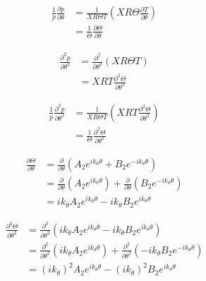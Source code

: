 \documentclass[a4paper]{article}
\begin{document}
\begin{align*}
    \frac{1}{p}\frac{\partial p}{\partial \theta} 
    &=
    \frac{ 1}{X R \Theta T}  \left( XR\Theta\frac{\partial T}{\partial \theta} \right) \\
    &=\frac{ 1}{ \Theta}\frac{\partial \Theta}{\partial \theta}  
\end{align*}

\begin{align*}
    \frac{\partial^2 p}{\partial \theta^2} 
    &=
    \frac{\partial^2 }{\partial \theta^2}  \left( XR\Theta T \right) \\
    &=
    XRT\frac{\partial^2 \Theta }{\partial \theta^2}  
\end{align*}


\begin{align*}
    \frac{1}{p}\frac{\partial^2 p}{\partial \theta^2} 
    &=
    \frac{ 1}{X R \Theta T}  \left( XRT\frac{\partial^2 \Theta}{\partial \theta^2} \right) \\
    &=\frac{ 1}{ \Theta}\frac{\partial^2 \Theta}{\partial \theta^2}  
\end{align*}

\begin{align*}
    \frac{\partial \Theta}{\partial \theta} &=
    \frac{\partial}{\partial \theta}
        \left( 
            A_2 e^{i k_{\theta} \theta} + B_2 e^{-i k_{\theta} \theta}
        \right)  \\
    &=
    \frac{\partial}{\partial \theta} \left(A_2 e^{i k_{\theta} \theta}  \right) +
    \frac{\partial}{\partial \theta} \left(B_2 e^{-i k_{\theta} \theta}  \right)\\ 
    &= i k_{\theta} A_2 e^{i k_{\theta} \theta} - i k_{\theta} B_2 e^{i k_{\theta} \theta} 
\end{align*}

\begin{align*}
    \frac{\partial^2 \Theta }{\partial \theta^2} &=
    \frac{\partial^2}{\partial \theta^2}
        \left( 
        i k_{\theta} A_2 e^{i k_{\theta} \theta} - i k_{\theta} B_2 e^{i k_{\theta} \theta} 
    \right)  \\
    &=
    \frac{\partial^2}{\partial \theta^2} \left(i k_{\theta} A_2 e^{i k_{\theta} \theta}  \right) +
    \frac{\partial^2}{\partial \theta^2} \left(- i k_{\theta} B_2 e^{-i k_{\theta} \theta}  \right)\\ 
    &= (i k_{\theta})^2 A_2 e^{i k_{\theta} \theta } - (i k_{\theta})^2 B_2 e^{i k_{\theta} \theta} 
\end{align*}
\end{document}
